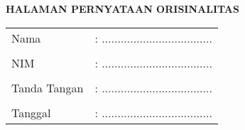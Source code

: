 \clearpage
{}%

\begin{center}
	\smallskip
	
	\normalsize \bfseries \MakeUppercase{Halaman Pernyataan Orisinalitas}
	
	\normalsize {}
	\vspace{3cm}
	
	\centering 
	\begin{tabular}{l l}
		Nama 			& : ................................... \\
		& \\
		NIM 			& : ................................... \\
		& \\
		Tanda Tangan 	& : ................................... \\
		& \\
		Tanggal 		& : ................................... \\
	\end{tabular}
	
\end{center}
\clearpage
